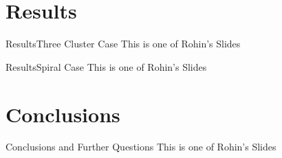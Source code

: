 \section{Results}

\begin{frame}{Results}{Three Cluster Case}
    This is one of Rohin's Slides
\end{frame}

\begin{frame}{Results}{Spiral Case}
    This is one of Rohin's Slides
\end{frame}

\section{Conclusions}

\begin{frame}{Conclusions and Further Questions}
    This is one of Rohin's Slides
\end{frame}